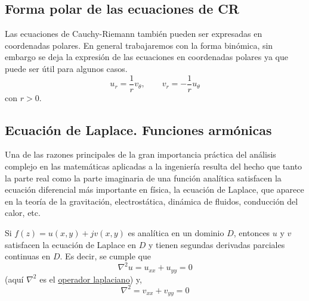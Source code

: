 \subsection{Forma polar de las ecuaciones de CR}

Las ecuaciones de Cauchy-Riemann también pueden ser expresadas en coordenadas polares. En general trabajaremos con la forma binómica, sin embargo se deja la expresión de las ecuaciones en coordenadas polares ya que puede ser útil para algunos casos.
\begin{equation}
  u_r = \frac{1}{r}v_\theta, \qquad v_r =  -\frac{1}{r}u_\theta
\end{equation} 
con $r>0$.

\subsection{Ecuación de Laplace. Funciones armónicas}\label{sec:laplace_eq}

Una de las razones principales de la gran importancia práctica del análisis complejo en las matemáticas aplicadas a la ingeniería resulta del hecho que tanto la parte real como la parte imaginaria de una función analítica satisfacen la ecuación diferencial más importante en física, la ecuación de Laplace, que aparece en la teoría de la gravitación, electrostática, dinámica de fluidos, conducción del calor, etc.

\begin{theorem}
  Si $f(z)=u(x,y)+jv(x,y)$ es analítica en un dominio $D$, entonces $u$ y $v$ satisfacen la ecuación de Laplace en $D$ y tienen segundas derivadas parciales continuas en $D$. Es decir, se cumple que
  \begin{equation}\label{eq:laplace_u}
    \nabla^2 u = u_{xx} + u_{yy} = 0
  \end{equation}
  (aquí $\nabla^2$ es el \href{https://en.wikipedia.org/wiki/Laplace_operator}{operador laplaciano}) y,
  \begin{equation}\label{eq:laplace_v}
    \nabla^2 = v_{xx} + v_{yy} = 0
  \end{equation}
\end{theorem}

